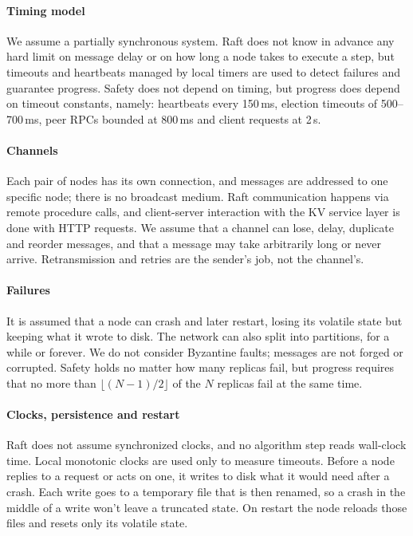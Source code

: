\documentclass[conference]{IEEEtran}
\begin{document}
\paragraph{Timing model}
We assume a partially synchronous system. Raft does not know in advance any hard limit on message delay or on how long a node takes to execute a step,
but timeouts and heartbeats managed by local timers are used to detect failures and guarantee progress. Safety does not depend on timing, but progress does depend on timeout constants, namely:
heartbeats every 150\,ms, election timeouts of 500--700\,ms, peer RPCs bounded at 800\,ms and client requests at 2\,s.

\paragraph{Channels}
Each pair of nodes has its own connection, and messages are addressed to one specific node; there is no broadcast medium. Raft communication happens via remote procedure calls,
and client-server interaction with the KV service layer is done with HTTP requests. We assume that a channel can lose, delay, duplicate and reorder messages,
and that a message may take arbitrarily long or never arrive. Retransmission and retries are the sender's job, not the channel's.

\paragraph{Failures}
It is assumed that a node can crash and later restart, losing its volatile state but keeping what it wrote to disk. The network can also split into partitions, for a while or forever.
We do not consider Byzantine faults; messages are not forged or corrupted. Safety holds no matter how many replicas fail,
but progress requires that no more than $\lfloor (N-1)/2 \rfloor$ of the $N$ replicas fail at the same time.

\paragraph{Clocks, persistence and restart}
Raft does not assume synchronized clocks, and no algorithm step reads wall-clock time. Local monotonic clocks are used only to measure timeouts.  Before a node replies to a request or acts on one, it writes to disk what it would need after a crash.  Each write goes to a temporary file that is then renamed, so a crash in the middle of a write won't leave a truncated state.  On restart the node reloads those files and resets only its volatile state.
\end{document}
